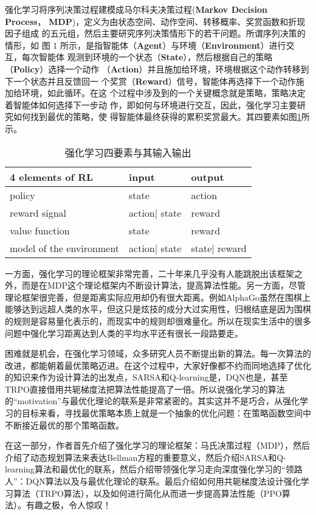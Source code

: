 强化学习将序列决策过程建模成马尔科夫决策过程(\textbf{Markov Decision Process}，
\textbf{MDP})，定义为由状态空间、动作空间、转移概率、奖赏函数和折现因子组成
的五元组，然后主要研究序列决策情形下的若干问题。所谓序列决策的情形，如
图 1 所示，是指智能体（\textbf{Agent}）与环境（\textbf{Environment}）进行交互，每次智能体
观测到环境的一个状态（\textbf{State}），然后根据自己的策略（\textbf{Policy}）选择一个动作
（\textbf{Action}）并且施加给环境，环境根据这个动作转移到下一个状态并且反馈回一
个奖赏（\textbf{Reward}）信号，智能体再选择下一个动作施加给环境，如此循环。在这
个过程中涉及到的一个关键概念就是策略，策略决定着智能体如何选择下一步动
作，即如何与环境进行交互，因此，强化学习主要研究如何找到最优的策略，使
得智能体最终获得的累积奖赏最大。其四要素如图\ref{4elements}所示。
\begin{table}[htbp]
  \centering
  \caption{强化学习四要素与其输入输出}
    \begin{tabular}{m{14.445em}m{6.39em}m{7em}}
    \toprule
    \toprule
    4 elements of RL & input & output \\
    \midrule
    policy & state & action \\
    reward signal & action| state & reward \\
    value function & state & reward \\
    model of the environment & action| state & state| reward \\
    \toprule
    \toprule
    \end{tabular}%
  \label{4elements}%
\end{table}%

一方面，强化学习的理论框架非常完善，二十年来几乎没有人能跳脱出该框架之外，而是在MDP这个理论框架内不断设计算法，提高算法性能。另一方面，尽管理论框架很完善，但是距离实际应用却仍有很大距离。例如AlphaGo虽然在围棋上能够达到远超人类的水平，但这只是炫技的成分大过实用性，归根结底是因为围棋的规则是容易量化表示的，而现实中的规则却很难量化。所以在现实生活中的很多问题中强化学习距离达到人类的平均水平还有很长一段路要走。

困难就是机会，在强化学习领域，众多研究人员不断提出新的算法。每一次算法的改进，都能朝着最优策略迈进。在这个过程中，大家好像都不约而同地选择了优化的知识来作为设计算法的出发点，SARSA和Q-learning是，DQN也是，甚至TRPO直接借用共轭梯度法把算法性能提高了一倍。所以说强化学习的算法的“motivation”与最优化理论的联系是非常紧密的。其实这并不是巧合，从强化学习的目标来看，寻找最优策略本质上就是一个抽象的优化问题：在策略函数空间中不断接近最优的那个策略函数。

在这一部分，作者首先介绍了强化学习的理论框架：马氏决策过程（MDP\cite{sutton2018reinforcement}），然后介绍了动态规划\cite{geramifard2013tutorial}\cite{szepesvari1996generalized}算法来表达Bellman方程\cite{otterlo2012reinforcement}的重要意义，然后介绍SARSA\cite{jaakkola1993convergence}和Q-learning\cite{rummery1994line}\cite{melo2001convergence}算法和最优化的联系，然后介绍带领强化学习走向深度强化学习的“领路人”：DQN\cite{mnih2013playing}\cite{mnih2015human}算法以及与最优化理论的联系。最后介绍如何用共轭梯度法设计强化学习算法（TRPO算法\cite{schulman2015trust}），以及如何进行简化从而进一步提高算法性能（PPO算法\cite{schulman2017proximal}）。有趣之极，令人惊叹！

